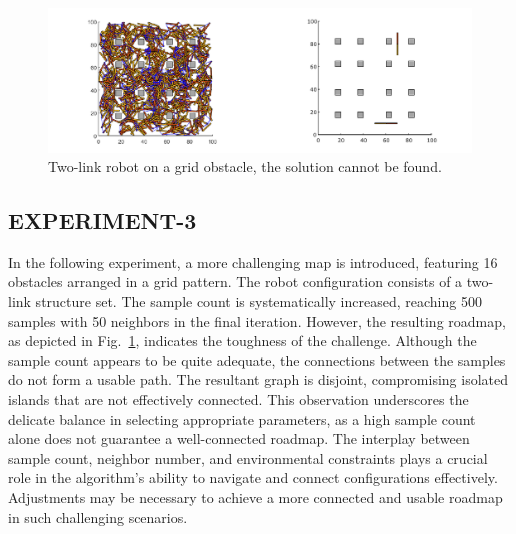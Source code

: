\documentclass{IEEEtaes}
\begin{document}
\begin{figure}[b]
    \vspace{-1em}
    \begin{center}
        \includegraphics[width=1\linewidth]{figures/NO-SOLUTION.pdf}
     \end{center}
     \vspace{-1em}
     \caption{Two-link robot on a grid obstacle, the solution cannot be found.}
     \label{no-solution}
     \vspace{-1em}
\end{figure}

\subsection{\fontsize{10}{13}\selectfont EXPERIMENT-3}
In the following experiment, a more challenging map is introduced, featuring 16 obstacles arranged in a grid pattern. The robot configuration consists of a two-link structure set. The sample count is systematically increased, reaching 500 samples with 50 neighbors in the final iteration.
However, the resulting roadmap, as depicted in Fig.~\ref{no-solution}, indicates the toughness of the challenge. Although the sample count appears to be quite adequate, the connections between the samples do not form a usable path. The resultant graph is disjoint, compromising isolated islands that are not effectively connected. This observation underscores the delicate balance in selecting appropriate parameters, as a high sample count alone does not guarantee a well-connected roadmap. The interplay between sample count, neighbor number, and environmental constraints plays a crucial role in the algorithm's ability to navigate and connect configurations effectively. Adjustments may be necessary to achieve a more connected and usable roadmap in such challenging scenarios.
\end{document}
